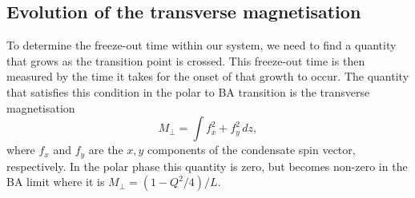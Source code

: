 \subsection{Evolution of the transverse magnetisation}
To determine the freeze-out time within our system, we need to find a quantity
that grows as the transition point is crossed.
This freeze-out time is then measured by the time it takes for the onset of
that growth to occur.
The quantity that satisfies this condition in the polar to BA transition is the
transverse magnetisation
\begin{equation}
    M_\perp = \int f_x^2 + f_y^2 \, dz,
\end{equation}
where $f_x$ and $f_y$ are the $x, y$ components of the condensate spin vector,
respectively.
In the polar phase this quantity is zero, but becomes non-zero in the BA limit
where it is $M_\perp = (1 - Q^2/4)/L$.
